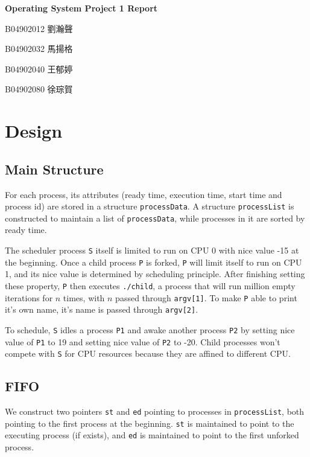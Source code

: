\documentclass{article}
\begin{document}
\fontsize{12pt}{20pt}\selectfont
\begin{center}
	\bfseries\huge{Operating System Project 1 Report}\\
\end{center}
{
    \hfill B04902012 劉瀚聲

    \hfill B04902032 馬揚格

    \hfill B04902040 王郁婷

    \hfill B04902080 徐琮賀\\
}
\section{Design}
    \subsection{Main Structure}

        For each process, its attributes (ready time, execution time, start time and process id) are stored in a structure {\tt processData}.
        A structure {\tt processList} is constructed to maintain a list of {\tt processData}, while processes in it are sorted by ready time.

        The scheduler process {\tt S} itself is limited to run on CPU 0 with nice value -15 at the beginning. Once a child process {\tt P} is forked, {\tt P} will limit itself to run on CPU 1, and its nice value is determined by scheduling principle. After finishing setting these property, {\tt P} then executes {\tt ./child}, a process that will run million empty iterations for \(n\) times, with \(n\) passed through {\tt argv[1]}. To make {\tt P} able to print it's own name, it's name is passed through {\tt argv[2]}.


        To schedule, {\tt S} idles a process {\tt P1} and awake another process {\tt P2} by setting nice value of {\tt P1}  to 19 and setting nice value of {\tt P2} to -20. Child processes won't compete with {\tt S} for CPU resources because they are affined to different CPU.
    
    \subsection{FIFO}
        We construct two pointers {\tt st} and {\tt ed} pointing to processes in {\tt processList}, both pointing to the first process at the beginning. {\tt st} is maintained to point to the executing process (if exists), and {\tt ed} is maintained to point to the first unforked process.
        
\end{document}
